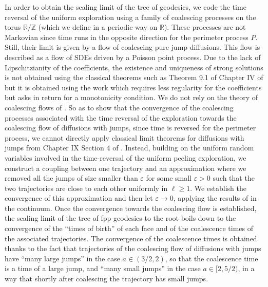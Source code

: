 \documentclass[11pt]{article}
\numberwithin{equation}{section}
\def\vp{\varepsilon}
\def \R{\mathbb {R}}
\def \Z{\mathbb{Z}}
\begin{document}
{In order to obtain the scaling limit of the tree of geodesics, we code the time reversal of the uniform exploration using a family of coalescing processes on the torus $\R/\Z$ (which we define in a periodic way on $\R$). These processes are not Markovian since time runs in the opposite direction for the perimeter process $P$. Still, their limit is given by a flow of coalescing pure jump diffusions. This flow is described as a flow of SDEs driven by a Poisson point process. Due to the lack of Lipschitzianity of the coefficients, the existence and uniqueness of strong solutions is not obtained using the classical theorems such as Theorem 9.1 of Chapter IV of \cite{IW89} but it is obtained using the work \cite{LP12} which requires less regularity for the coefficients but asks in return {for} a monotonicity condition. We do not rely on the theory of coalescing flows of \cite{LJR04}. So as to show that the convergence of the coalescing processes associated with the time reversal of the exploration towards the coalescing flow of diffusions with jumps, since time is reversed for the perimeter process, we cannot directly apply classical limit theorems for diffusions with jumps from Chapter IX Section 4 of \cite{JS87}. Instead, building on the uniform random variables involved in the time-reversal of the uniform peeling exploration, we construct a coupling between one trajectory and an approximation where we removed all the jumps of size smaller than $\vp$ for some small $\vp>0$ such that the two trajectories are close to each other uniformly in $\ell\ge 1$. We establish the convergence of this approximation and then let $\vp\to 0$, applying the results of \cite{JS87} in the continuum. Once the convergence towards the coalescing flow is established, the scaling limit of the tree of fpp geodesics to the root boils down to the convergence of the ``times of birth'' of each face and of the coalescence times of the associated trajectories. The convergence of the coalescence times is obtained thanks to the fact that trajectories of the coalescing flow of diffusions with jumps have ``many large jumps'' in the case $a \in (3/2,2)$, so that the coalescence time is a time of a large jump, and ``many small jumps'' in the case $a \in [2,5/2)$, in a way that shortly after coalescing the trajectory has small jumps.
}
\end{document}
